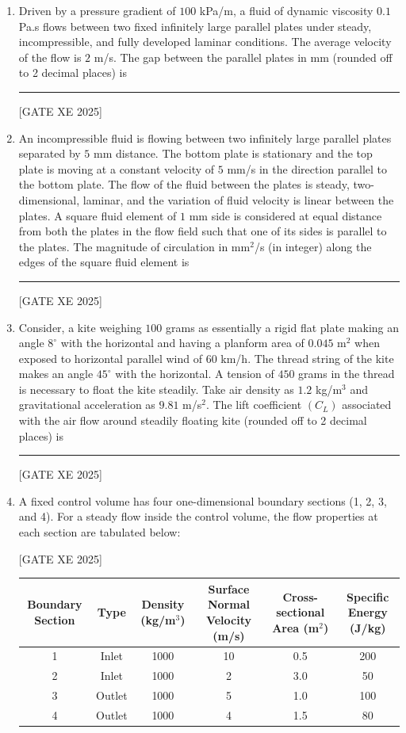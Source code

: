 \documentclass[journal,12pt,onecolumn]{IEEEtran}
\theoremstyle{remark}
\begin{document}
\begin{enumerate}
\item Driven by a pressure gradient of $100$ kPa/m, a fluid of dynamic viscosity $0.1$ Pa.s flows between two fixed infinitely large parallel plates under steady, incompressible, and fully developed laminar conditions. The average velocity of the flow is $2$ m/s. The gap between the parallel plates in mm (rounded off to 2 decimal places) is \rule{3cm}{0.15mm} \label{q:37}

\hfill[GATE XE 2025]


\item An incompressible fluid is flowing between two infinitely large parallel plates separated by $5$ mm distance. The bottom plate is stationary and the top plate is moving at a constant velocity of $5$ mm/s in the direction parallel to the bottom plate. The flow of the fluid between the plates is steady, two-dimensional, laminar, and the variation of fluid velocity is linear between the plates. A square fluid element of $1$ mm side is considered at equal distance from both the plates in the flow field such that one of its sides is parallel to the plates. The magnitude of circulation in mm$^2$/s (in integer) along the edges of the square fluid element is \rule{3cm}{0.15mm} \label{q:38}

\hfill[GATE XE 2025]


\item Consider, a kite weighing $100$ grams as essentially a rigid flat plate making an angle $8^\circ$ with the horizontal and having a planform area of $0.045$ m$^2$ when exposed to horizontal parallel wind of $60$ km/h. The thread string of the kite makes an angle $45^\circ$ with the horizontal. A tension of $450$ grams in the thread is necessary to float the kite steadily. Take air density as $1.2$ kg/m$^3$ and gravitational acceleration as $9.81$ m/s$^2$. The lift coefficient $(C_L)$ associated with the air flow around steadily floating kite (rounded off to 2 decimal places) is \rule{3cm}{0.15mm} \label{q:39}

\hfill[GATE XE 2025]


\item A fixed control volume has four one-dimensional boundary sections (1, 2, 3, and 4). For a steady flow inside the control volume, the flow properties at each section are tabulated below: \label{q:40}

\hfill[GATE XE 2025]

\begin{tabular}{|c|c|c|c|c|c|}
\hline
Boundary Section & Type & Density (kg/m$^3$) & Surface Normal Velocity (m/s) & Cross-sectional Area (m$^2$) & Specific Energy (J/kg) \\
\hline
1 & Inlet & 1000 & 10 & 0.5 & 200 \\
\hline
2 & Inlet & 1000 & 2 & 3.0 & 50 \\
\hline
3 & Outlet & 1000 & 5 & 1.0 & 100 \\
\hline
4 & Outlet & 1000 & 4 & 1.5 & 80 \\
\hline
\end{tabular}


\end{enumerate}
\end{document}
